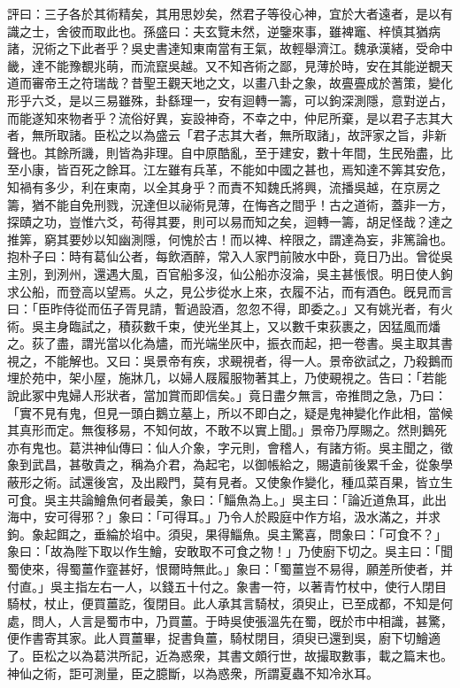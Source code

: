 \begin{pinyinscope}
評曰：三子各於其術精矣，其用思妙矣，然君子等役心神，宜於大者遠者，是以有識之士，舍彼而取此也。孫盛曰：夫玄覽未然，逆鑒來事，雖裨竈、梓慎其猶病諸，況術之下此者乎？吳史書達知東南當有王氣，故輕舉濟江。魏承漢緒，受命中畿，達不能豫覩兆萌，而流竄吳越。又不知吝術之鄙，見薄於時，安在其能逆覩天道而審帝王之符瑞哉？昔聖王觀天地之文，以畫八卦之象，故亹亹成於蓍策，變化形乎六爻，是以三易雖殊，卦繇理一，安有迴轉一籌，可以鉤深測隱，意對逆占，而能遂知來物者乎？流俗好異，妄設神奇，不幸之中，仲尼所棄，是以君子志其大者，無所取諸。臣松之以為盛云「君子志其大者，無所取諸」，故評家之旨，非新聲也。其餘所譏，則皆為非理。自中原酷亂，至于建安，數十年間，生民殆盡，比至小康，皆百死之餘耳。江左雖有兵革，不能如中國之甚也，焉知達不筭其安危，知禍有多少，利在東南，以全其身乎？而責不知魏氏將興，流播吳越，在京房之籌，猶不能自免刑戮，況達但以祕術見薄，在悔吝之間乎！古之道術，蓋非一方，探賾之功，豈惟六爻，苟得其要，則可以易而知之矣，迴轉一籌，胡足怪哉？達之推筭，窮其要妙以知幽測隱，何愧於古！而以裨、梓限之，謂達為妄，非篤論也。抱朴子曰：時有葛仙公者，每飲酒醉，常入人家門前陂水中卧，竟日乃出。曾從吳主別，到洌州，還遇大風，百官船多沒，仙公船亦沒淪，吳主甚悵恨。明日使人鉤求公船，而登高以望焉。乆之，見公步從水上來，衣履不沾，而有酒色。旣見而言曰：「臣昨侍從而伍子胥見請，暫過設酒，忽忽不得，即委之。」又有姚光者，有火術。吳主身臨試之，積荻數千束，使光坐其上，又以數千束荻裹之，因猛風而燔之。荻了盡，謂光當以化為燼，而光端坐灰中，振衣而起，把一卷書。吳主取其書視之，不能解也。又曰：吳景帝有疾，求覡視者，得一人。景帝欲試之，乃殺鵝而埋於苑中，架小屋，施牀几，以婦人屐履服物著其上，乃使覡視之。告曰：「若能說此冢中鬼婦人形狀者，當加賞而即信矣。」竟日盡夕無言，帝推問之急，乃曰：「實不見有鬼，但見一頭白鵝立墓上，所以不即白之，疑是鬼神變化作此相，當候其真形而定。無復移易，不知何故，不敢不以實上聞。」景帝乃厚賜之。然則鵝死亦有鬼也。葛洪神仙傳曰：仙人介象，字元則，會稽人，有諸方術。吳主聞之，徵象到武昌，甚敬貴之，稱為介君，為起宅，以御帳給之，賜遺前後累千金，從象學蔽形之術。試還後宮，及出殿門，莫有見者。又使象作變化，種瓜菜百果，皆立生可食。吳主共論鱠魚何者最美，象曰：「鯔魚為上。」吳主曰：「論近道魚耳，此出海中，安可得邪？」象曰：「可得耳。」乃令人於殿庭中作方埳，汲水滿之，并求鉤。象起餌之，垂綸於埳中。須臾，果得鯔魚。吳主驚喜，問象曰：「可食不？」象曰：「故為陛下取以作生鱠，安敢取不可食之物！」乃使廚下切之。吳主曰：「聞蜀使來，得蜀薑作韲甚好，恨爾時無此。」象曰：「蜀薑豈不易得，願差所使者，并付直。」吳主指左右一人，以錢五十付之。象書一符，以著青竹杖中，使行人閉目騎杖，杖止，便買薑訖，復閉目。此人承其言騎杖，須臾止，已至成都，不知是何處，問人，人言是蜀市中，乃買薑。于時吳使張溫先在蜀，旣於市中相識，甚驚，便作書寄其家。此人買薑畢，捉書負薑，騎杖閉目，須臾已還到吳，廚下切鱠適了。臣松之以為葛洪所記，近為惑衆，其書文頗行世，故撮取數事，載之篇末也。神仙之術，詎可測量，臣之臆斷，以為惑衆，所謂夏蟲不知冷氷耳。


\end{pinyinscope}